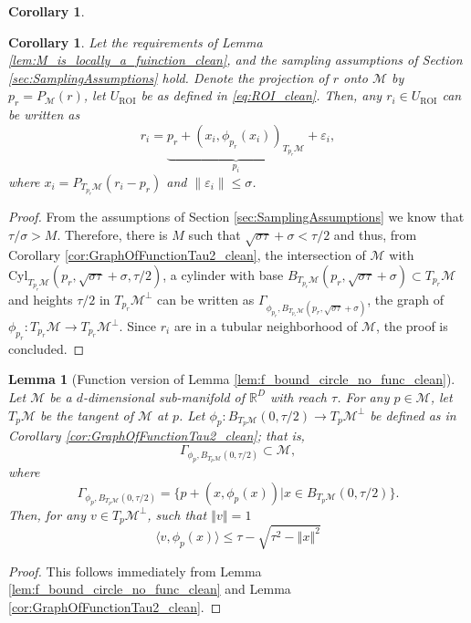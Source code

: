 \documentclass[12pt]{article}
\newtheorem{Lemma}[Theorem]{Lemma}
\newtheorem{corollary}[Theorem]{Corollary}
\theoremstyle{remark}
\newcommand{\RR}{\mathbb{R}}
\newcommand{\MM}{\mathcal{M}}
\newcommand{\eps}{\varepsilon}
\newcommand{\norm}[1]{\left\Vert #1 \right\Vert}
\newcommand{\lrangle}[1]{\langle #1 \rangle}
\begin{document}
\begin{appendices}
\begin{corollary}
\end{corollary}

\begin{corollary}\label{cor:GraphOfFunctionTau_ROI}
Let the requirements of Lemma \ref{lem:M_is_locally_a_fuinction_clean}, and the sampling assumptions of Section \ref{sec:SamplingAssumptions} hold. Denote the projection of $r$ onto $\MM$ by $p_r = P_\MM(r)$, let $U_{\textrm{ROI}}$ be as defined in \eqref{eq:ROI_clean}. 
Then, any $r_i \in U_{\textrm{ROI}}$ can be written as
\begin{equation}\label{eq:FunctionGraph_pi_ei_clean}
r_i = \underbrace{p_r + (x_i, \phi_{p_r}(x_i))_{T_{p_r}\MM}}_{p_i}+\eps_i
,\end{equation}
where $x_i= P_{T_{p_r}\MM}(r_i - p_r)$ and $\|\eps_i\| \leq \sigma$.
\end{corollary}
\begin{proof}
From the assumptions of Section \ref{sec:SamplingAssumptions} we know that  $\tau/\sigma > M $.
Therefore, there is $M$ such that $\sqrt{\sigma\tau}+\sigma < \tau/2$ and thus, from Corollary \ref{cor:GraphOfFunctionTau2_clean}, the intersection of $\MM$ with $\textrm{Cyl}_{T_{p_r}\MM}(p_r,\sqrt{\sigma \tau}+\sigma, \tau/2)$, a cylinder with base $B_{T_{p_r}\MM}(p_r, \sqrt{\sigma\tau}+\sigma)\subset T_{p_r}\MM$ and heights $\tau/2$ in $T_{p_r}\MM^\perp$ can be written as $\Gamma_{\phi_{p_r}, B_{T_{p_r}\MM}(p_r, \sqrt{\sigma\tau} + \sigma)}$, the graph of $\phi_{p_r}:T_{p_r}\MM\to T_{p_r}\MM^\perp$. Since $r_i$ are in a tubular neighborhood of $\MM$, the proof is concluded. 
\end{proof}


\begin{Lemma}[Function version of Lemma \ref{lem:f_bound_circle_no_func_clean}]\label{lem:f_bound_circle_clean}
    Let $\MM$ be a $d$-dimensional sub-manifold of $\RR^D$ with reach $\tau$. For any $p \in \MM$, let $T_{p}\MM$ be the tangent of $\MM$ at $p$.
    Let $\phi_p:B_{T_p\MM}(0, \tau/2)\to T_p\MM^\perp$ be defined as in Corollary \ref{cor:GraphOfFunctionTau2_clean}; that is, 
    \[\Gamma_{\phi_p,B_{T_p\MM}(0, \tau/2)}\subset\MM,\]
    where
    \[\Gamma_{\phi_p,B_{T_p\MM}(0, \tau/2)} = \{p + (x, \phi_p(x)) | x\in B_{T_p\MM}(0, \tau/2)\}.\]
    Then, for any $v \in T_p\MM^\perp$, such that $\norm{v} = 1$
    \[
    \lrangle{v, \phi_p(x)} \leq \tau-\sqrt{\tau^2-\norm{x}^2}
    \]
\end{Lemma}
\begin{proof}
    This follows immediately from Lemma \ref{lem:f_bound_circle_no_func_clean} and Lemma \ref{cor:GraphOfFunctionTau2_clean}.
\end{proof}


\end{appendices}
\end{document}
